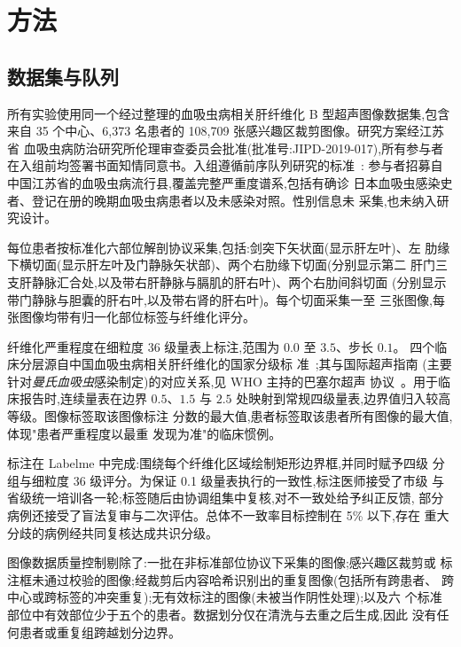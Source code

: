 \section{方法}
\label{sec:methods}

\subsection{数据集与队列}

所有实验使用同一个经过整理的血吸虫病相关肝纤维化 B 型超声图像数据集,包含
来自 35 个中心、6,373 名患者的 108,709 张感兴趣区裁剪图像。研究方案经江苏省
血吸虫病防治研究所伦理审查委员会批准(批准号:JIPD-2019-017),所有参与者
在入组前均签署书面知情同意书。入组遵循前序队列研究的标准~\cite{xu2026sfibai}:
参与者招募自中国江苏省的血吸虫病流行县,覆盖完整严重度谱系,包括有确诊
日本血吸虫感染史者、登记在册的晚期血吸虫病患者以及未感染对照。性别信息未
采集,也未纳入研究设计。

每位患者按标准化六部位解剖协议采集,包括:剑突下矢状面(显示肝左叶)、左
肋缘下横切面(显示肝左叶及门静脉矢状部)、两个右肋缘下切面(分别显示第二
肝门三支肝静脉汇合处,以及带右肝静脉与膈肌的肝右叶)、两个右肋间斜切面
(分别显示带门静脉与胆囊的肝右叶,以及带右肾的肝右叶)。每个切面采集一至
三张图像,每张图像均带有归一化部位标签与纤维化评分。

纤维化严重程度在细粒度 36 级量表上标注,范围为 $0.0$ 至 $3.5$、步长 $0.1$。
四个临床分层源自中国血吸虫病相关肝纤维化的国家分级标
准~\cite{moh2000schistomanual,moh2006schistocriteria};其与国际超声指南
(主要针对\emph{曼氏血吸虫}感染制定)的对应关系,见 WHO 主持的巴塞尔超声
协议~\cite{richter2025basel}。用于临床报告时,连续量表在边界 $0.5$、$1.5$
与 $2.5$ 处映射到常规四级量表,边界值归入较高等级。图像标签取该图像标注
分数的最大值,患者标签取该患者所有图像的最大值,体现"患者严重程度以最重
发现为准"的临床惯例。

标注在 Labelme 中完成:围绕每个纤维化区域绘制矩形边界框,并同时赋予四级
分组与细粒度 36 级评分。为保证 0.1 级量表执行的一致性,标注医师接受了市级
与省级统一培训各一轮;标签随后由协调组集中复核,对不一致处给予纠正反馈,
部分病例还接受了盲法复审与二次评估。总体不一致率目标控制在 5\% 以下,存在
重大分歧的病例经共同复核达成共识分级。

图像数据质量控制剔除了:一批在非标准部位协议下采集的图像;感兴趣区裁剪或
标注框未通过校验的图像;经裁剪后内容哈希识别出的重复图像(包括所有跨患者、
跨中心或跨标签的冲突重复);无有效标注的图像(未被当作阴性处理);以及六
个标准部位中有效部位少于五个的患者。数据划分仅在清洗与去重之后生成,因此
没有任何患者或重复组跨越划分边界。

